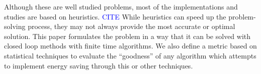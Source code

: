 Although these are well studied problems, most of the implementations and studies are based on heuristics. \textcolor{blue}{CITE}
While heuristics can speed up the problem-solving process, they may not always provide the most accurate or optimal solution. 
This paper formulates the problem in a way that it can be solved with closed loop methods with finite time algorithms. 
We also define a metric based on statistical techniques to evaluate the “goodness” of any algorithm which attempts to implement energy saving through this or other techniques. 

\begin{comment}
O-RAN defines rApps [O-RAN Alliance, "O-RAN Architecture Description," O-RAN.WG1.O-RAN-Architecture-Description-v03.00, July 2020.] as modular applications designed to consume and/or produces non real time management and automation services for the orchestration and optimization of network resources and operations. 
The non-RT RIC, in particular, is designed to handle tasks that do not require immediate response. This makes it ideal for applications focused on long-term optimization and strategic planning, such as energy control. 
The rApp receives input data from the Radio Database, Traffic Predictor, and Coverage Predictor, and sends a policy, sent as a declarative statement and across the A1 interface, to the Near-RT RIC over what to do. 
The decision is made periodically, with a 1-hour prediction window and 15-minute slots, i.e., four predictions are made every window. 
The rApp is designed to be shared across multiple rApps and can import data from RF link simulators and drive tests through an external interface. 
A Dashboard for visualization of the Radio Mapping Database is also used as shown in the given figure /begin{comment}[\textcolor{blue}{CITE}]/end{comment}. \\

The rApp is data driven in the sense that it does not incorporate a rules-based logic but determines the rules which meet the target objective based on the input data and network configuration. 

How does this link to the TS xApp? (receive a policy from the rApp)  \\

Space-time partitioning: This is a technique used to divide data based on both spatial (location) and temporal (time) dimensions. In the context of the rApp, this could involve organizing Key Performance Indicators (KPIs) by specific geographical areas (cells, sectors, etc.) and time periods to better manage and analyze the data.

Continuous time-based aggregation: This refers to the process of continuously collecting and summarizing data over time. Instead of analyzing data at discrete intervals, it is aggregated in a continuous manner, which allows for more fluid and accurate monitoring of KPIs.

Group KPIs by time: This involves organizing the Key Performance Indicators (KPIs) into groups based on the time they were recorded. This helps in analyzing trends and patterns over specific time periods.
\end{comment}